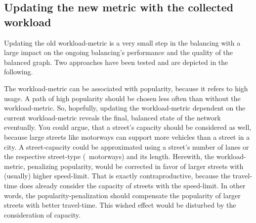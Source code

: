     \subsection{Updating the new metric with the collected workload}
    \label{chap:balancing:update}

        Updating the old workload-\gls{metric} is a very small step in the \gls{balancing} with a large impact on the ongoing \gls{balancing}'s performance and the quality of the balanced graph.
        Two approaches have been tested and are depicted in the following.

        The workload-\gls{metric} can be associated with popularity, because it refers to high usage.
        A path of high popularity should be chosen less often than without the workload-\gls{metric}.
        So, hopefully, updating the workload-\gls{metric} dependent on the current workload-\gls{metric} reveals the final, balanced state of the network eventually.
        You could argue, that a street's capacity should be considered as well, because large streets like motorways can support more vehicles than a street in a city.
        A street-capacity could be approximated using a street's number of lanes or the respective street-type (\eg\ motorways) and its length.
        Herewith, the workload-\gls{metric}, penalizing popularity, would be corrected in favor of larger streets with (usually) higher speed-limit.
        That is exactly contraproductive, because the travel-time does already consider the capacity of streets with the speed-limit.
        In other words, the popularity-penalization should compensate the popularity of larger streets with better travel-time.
        This wished effect would be disturbed by the consideration of capacity.


